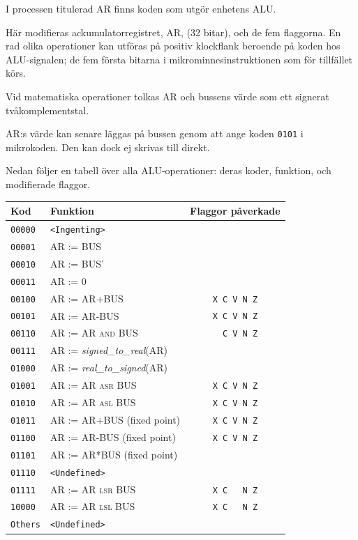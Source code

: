 \documentclass[]{article}
\begin{document}
I processen titulerad AR finns koden som utgör enhetens ALU.

Här modifieras ackumulatorregistret, AR, (32 bitar), och de fem flaggorna. En rad olika operationer kan utföras på positiv klockflank beroende på koden hos ALU-signalen; de fem första bitarna i mikrominnesinstruktionen som för tillfället körs.

Vid matematiska operationer tolkas AR och bussens värde som ett signerat tvåkomplementstal.

AR:s värde kan senare läggas på bussen genom att ange koden \texttt{0101} i mikrokoden. Den kan dock ej skrivas till direkt.

Nedan följer en tabell över alla ALU-operationer: deras koder, funktion, och modifierade flaggor.
\\

\begin{tabular}{llc}
\textbf{Kod} & \textbf{Funktion} & \textbf{Flaggor påverkade}\\
\hline
\texttt{00000} & \texttt{<Ingenting>} & \\
\texttt{00001} & AR := BUS &  \\
\texttt{00010} & AR := BUS' & \\
\texttt{00011} & AR := 0 & \\
\texttt{00100} & AR := AR+BUS & \texttt{X C V N Z}\\
\texttt{00101} & AR := AR-BUS & \texttt{X C V N Z} \\
\texttt{00110} & AR := AR \textsc{and} BUS & \texttt{{ } C V N Z}\\
\texttt{00111} & AR := \textit{signed\_to\_real}(AR) & \\
\texttt{01000} & AR := \textit{real\_to\_signed}(AR) & \\
\texttt{01001} & AR := AR \textsc{asr} BUS & \texttt{X C V N Z}\\
\texttt{01010} & AR := AR \textsc{asl} BUS & \texttt{X C V N Z}\\
\texttt{01011} & AR := AR+BUS (fixed point) & \texttt{X C V N Z} \\
\texttt{01100} & AR := AR-BUS (fixed point) & \texttt{X C V N Z} \\
\texttt{01101} & AR := AR*BUS (fixed point) &  \\
\texttt{01110} & \texttt{<Undefined>} & \\
\texttt{01111} & AR := AR \textsc{lsr} BUS & \texttt{X C { } N Z}\\
\texttt{10000} & AR := AR \textsc{lsl} BUS & \texttt{X C { } N Z}\\
\texttt{Others} & \texttt{<Undefined>} &
\end{tabular}
\\
\end{document}
